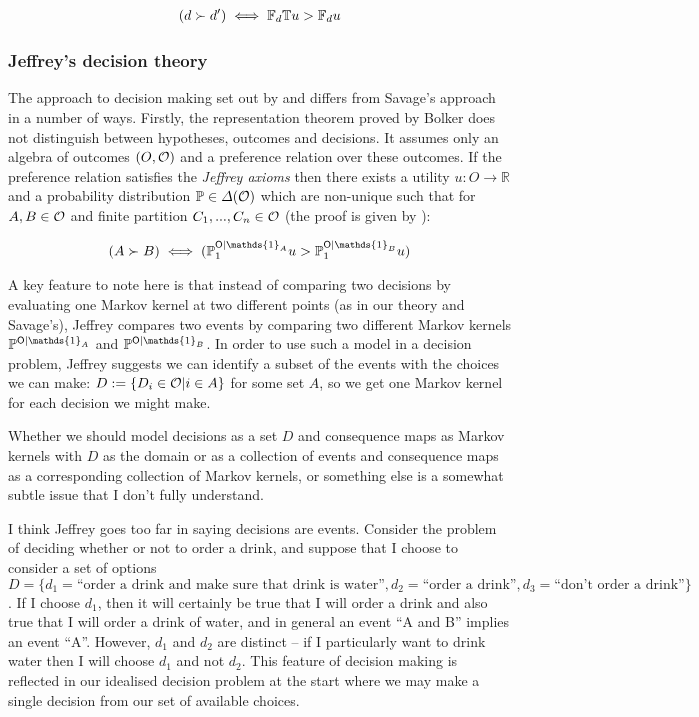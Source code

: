 \begin{align}
    (d\succ d')\iff \mathbb{F}_d\mathbb{T} u > \mathbb{F}_d u\label{eq:savage_utility2}
\end{align}


\subsubsection{Jeffrey's decision theory}

The approach to decision making set out by \citet{jeffrey_logic_1990} and \citet{bolker_functions_1966} differs from Savage's approach in a number of ways. Firstly, the representation theorem proved by Bolker does not distinguish between hypotheses, outcomes and decisions. It assumes only an algebra of outcomes $(O,\mathcal{O})$ and a preference relation over these outcomes. If the preference relation satisfies the \emph{Jeffrey axioms} then there exists a utility $u:O\to\mathbb{R}$ and a probability distribution $\mathbb{P}\in \Delta(\mathcal{O})$ which are non-unique such that for $A,B\in \mathcal{O}$ and finite partition $C_1,...,C_n\in \mathcal{O}$ (the proof is given by \citet{bolker_functions_1966}):

\begin{align}
    (A \succ B) \iff (\prob{P}^{\RV{O}|\mathds{1}_A}_1u>\prob{P}^{\RV{O}|\mathds{1}_B}_1u) \label{eq:ev_dec_theory}
\end{align}

A key feature to note here is that instead of comparing two decisions by evaluating one Markov kernel at two different points (as in our theory and Savage's), Jeffrey compares two events by comparing two different Markov kernels $\prob{P}^{\RV{O}|\mathds{1}_A}$ and $\prob{P}^{\RV{O}|\mathds{1}_B}$.  In order to use such a model in a decision problem, Jeffrey suggests we can identify a subset of the events with the choices we can make: $D:=\{D_i\in \mathcal{O}|i\in A\}$ for some set $A$, so we get one Markov kernel for each decision we might make. 

Whether we should model decisions as a set $D$ and consequence maps as Markov kernels with $D$ as the domain or as a collection of events and consequence maps as a corresponding collection of Markov kernels, or something else is a somewhat subtle issue that I don't fully understand.

I think Jeffrey goes too far in saying decisions are events. Consider the problem of deciding whether or not to order a drink, and suppose that I choose to consider a set of options $D=\{d_1=\text{``order a drink and make sure that drink is water''}, d_2=\text{``order a drink''}, d_3=\text{``don't order a drink''}\}$. If I choose $d_1$, then it will certainly be true that I will order a drink and also true that I will order a drink of water, and in general an event ``A and B'' implies an event ``A''. However, $d_1$ and $d_2$ are distinct -- if I particularly want to drink water then I will choose $d_1$ and not $d_2$. This feature of decision making is reflected in our idealised decision problem at the start where we may make a single decision from our set of available choices.

